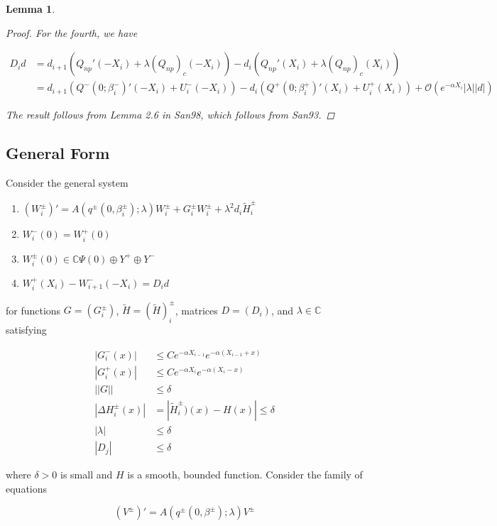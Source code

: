 \documentclass[12pt]{article}
\def\C{{\mathbb C}}
\newtheorem{lemma}{Lemma}
\begin{document}
\begin{lemma}
\begin{proof}
For the fourth, we have

\begin{align*}
D_i d &= d_{i+1}(Q_{np}'(-X_i) + \lambda (Q_{np})_c(-X_i)) - d_i ( Q_{np}'(X_i) + \lambda (Q_{np})_c(X_i) ) \\
&= d_{i+1} (Q^-(0; \beta_i^-)'(-X_i) + U_i^-(-X_i)) - d_i (Q^+(0; \beta_i^+)'(X_i) + U_i^+(X_i)) + \mathcal{O}(e^{-\alpha X_i} |\lambda||d|)
\end{align*}

The result follows from Lemma 2.6 in San98, which follows from San93.

\end{proof}
\end{lemma}

\subsection{General Form}

Consider the general system

\begin{enumerate}
\item $(W_i^\pm)' = A(q^\pm(0, \beta_i^\pm); \lambda) W_i^\pm + G_i^\pm W_i^\pm + \lambda^2 d_i \tilde{H}_i^\pm$
\item $W_i^-(0) = W_i^+(0)$
\item $W_i^\pm(0) \in \C \Psi(0) \oplus Y^+ \oplus Y^- $
\item $W_i^+(X_i) - W_{i+1}^-(-X_i) = D_i d$
\end{enumerate}

for functions $G = (G_i^\pm)$, $\tilde{H} = (\tilde{H})_i^\pm$, matrices $D = (D_i)$, and $\lambda \in \C$ satisfying 

\begin{align}
|G_i^-(x)| &\leq C e^{-\alpha X_{i-1}} e^{-\alpha(X_{i-1} + x) } \\
|G_i^+(x)| &\leq C e^{-\alpha X_i} e^{-\alpha(X_i - x) } \\
||G|| &\leq \delta \\
|\Delta H_i^\pm(x)| &= |\tilde{H}_i^\pm)(x) - H(x)| \leq \delta \\
|\lambda| &\leq \delta \\
|D_j| &\leq \delta
\end{align}

where $\delta > 0$ is small and $H$ is a smooth, bounded function. Consider the family of equations

\begin{equation}\label{varparam}
(V^\pm)' = A(q^\pm(0, \beta^\pm); \lambda) V^\pm
\end{equation}
\end{document}
